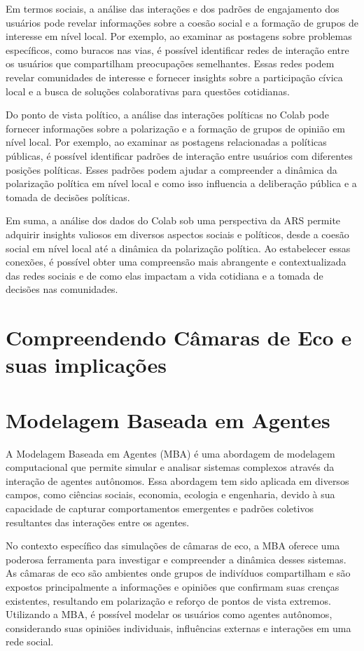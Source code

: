 Em termos sociais, a análise das interações e dos padrões de engajamento dos usuários pode revelar informações sobre a coesão social e a formação de grupos de interesse em nível local. Por exemplo, ao examinar as postagens sobre problemas específicos, como buracos nas vias, é possível identificar redes de interação entre os usuários que compartilham preocupações semelhantes. Essas redes podem revelar comunidades de interesse e fornecer insights sobre a participação cívica local e a busca de soluções colaborativas para questões cotidianas.

Do ponto de vista político, a análise das interações políticas no Colab pode fornecer informações sobre a polarização e a formação de grupos de opinião em nível local. Por exemplo, ao examinar as postagens relacionadas a políticas públicas, é possível identificar padrões de interação entre usuários com diferentes posições políticas. Esses padrões podem ajudar a compreender a dinâmica da polarização política em nível local e como isso influencia a deliberação pública e a tomada de decisões políticas.

Em suma, a análise dos dados do Colab sob uma perspectiva da ARS permite adquirir insights valiosos em diversos aspectos sociais e políticos, desde a coesão social em nível local até a dinâmica da polarização política. Ao estabelecer essas conexões, é possível obter uma compreensão mais abrangente e contextualizada das redes sociais e de como elas impactam a vida cotidiana e a tomada de decisões nas comunidades.

\section{Compreendendo Câmaras de Eco e suas implicações}
\label{05_echochambers}


\section{Modelagem Baseada em Agentes}
A Modelagem Baseada em Agentes (MBA) é uma abordagem de modelagem computacional que permite simular e analisar sistemas complexos através da interação de agentes autônomos. Essa abordagem tem sido aplicada em diversos campos, como ciências sociais, economia, ecologia e engenharia, devido à sua capacidade de capturar comportamentos emergentes e padrões coletivos resultantes das interações entre os agentes.

No contexto específico das simulações de câmaras de eco, a MBA oferece uma poderosa ferramenta para investigar e compreender a dinâmica desses sistemas. As câmaras de eco são ambientes onde grupos de indivíduos compartilham e são expostos principalmente a informações e opiniões que confirmam suas crenças existentes, resultando em polarização e reforço de pontos de vista extremos. Utilizando a MBA, é possível modelar os usuários como agentes autônomos, considerando suas opiniões individuais, influências externas e interações em uma rede social.

